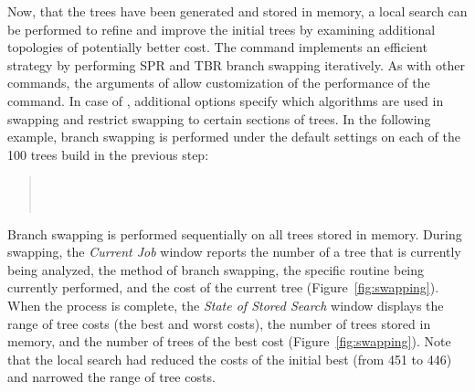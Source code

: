 Now, that the trees have been generated and stored in memory, a local search can be performed to refine and improve the initial trees by examining additional topologies of potentially better cost.  The command  implements an efficient strategy by performing SPR and TBR branch swapping iteratively. As with other commands, the arguments of  allow customization of the performance of the command. In case of , additional options specify which algorithms are used in swapping and restrict swapping to certain sections of trees. In the following example, branch swapping is performed under the default settings on each of the 100 trees build in the previous step:

\begin{quote}
 	\\
 	\\
\end{quote}

Branch swapping is performed sequentially on all trees stored in memory. During swapping, the \emph{Current Job} window reports the number of a tree that is currently being analyzed, the method of branch swapping, the specific routine being currently performed, and the cost of the current tree (Figure~\ref{fig:swapping}). When the process is complete, the \emph{State of Stored Search} window displays the range of tree costs (the best and worst costs), the number of trees stored in memory, and the number of trees of the best cost (Figure~\ref{fig:swapping}). Note that the local search had reduced the costs of the initial best (from 451 to 446) and narrowed the range of tree costs.

